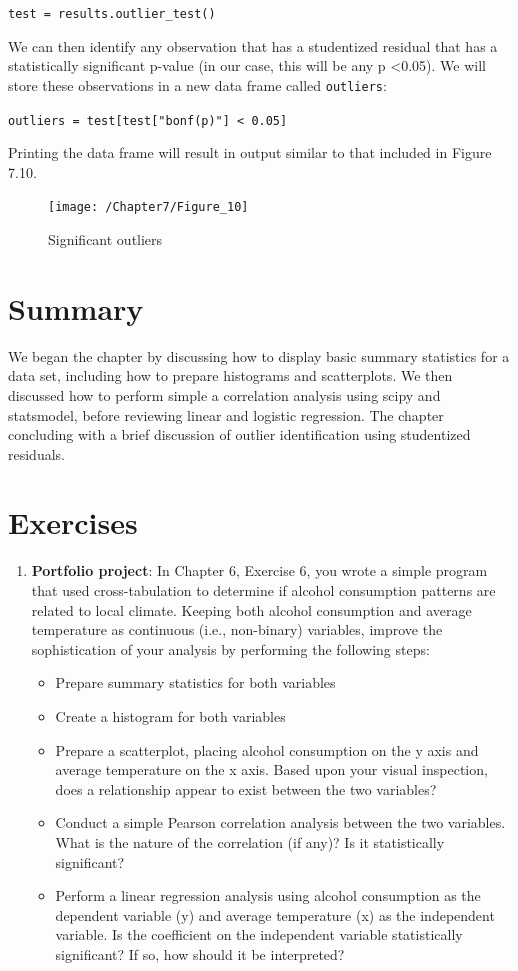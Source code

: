 \documentclass{book}
\begin{document}
\texttt{test = results.outlier\_test()}

We can then identify any observation that has a studentized residual that has a statistically significant p-value (in our case, this will be any p \textless 0.05). We will store these observations in a new data frame called \texttt{outliers}:

\texttt{outliers = test[test["bonf(p)"] < 0.05]}

Printing the data frame will result in output similar to that included in Figure 7.10.

\begin{figure}[h]
	\caption{Significant outliers}
	\centering\texttt{[image: /Chapter7/Figure\_10]}
\end{figure}

\section{Summary}

We began the chapter by discussing how to display basic summary statistics for a data set, including how to prepare histograms and scatterplots. We then discussed how to perform simple a correlation analysis using scipy and statsmodel, before reviewing linear and logistic regression. The chapter concluding with a brief discussion of outlier identification using studentized residuals.

\section{Exercises}
\begin{enumerate}
	\item \textbf{Portfolio project}: In Chapter 6, Exercise 6, you wrote a simple program that used cross-tabulation to determine if alcohol consumption patterns are related to local climate. Keeping both alcohol consumption and average temperature as continuous (i.e., non-binary) variables, improve the sophistication of your analysis by performing the following steps:
	\begin{itemize}
		\item Prepare summary statistics for both variables
		\item Create a histogram for both variables
		\item Prepare a scatterplot, placing alcohol consumption on the y axis and average temperature on the x axis. Based upon your visual inspection, does a relationship appear to exist between the two variables?
		\item Conduct a simple Pearson correlation analysis between the two variables. What is the nature of the correlation (if any)? Is it statistically significant?
		\item Perform a linear regression analysis using alcohol consumption as the dependent variable (y) and average temperature (x) as the independent variable. Is the coefficient on the independent variable statistically significant? If so, how should it be interpreted?	
	\end{itemize}
\end{enumerate}
\end{document}
